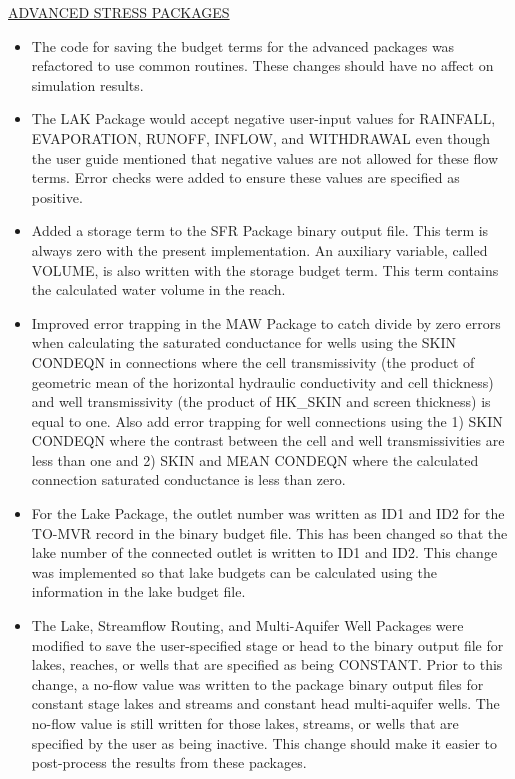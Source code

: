 \documentclass[11pt,twoside,twocolumn]{usgsreport}
\begin{document}
\begin{itemize}
	\underline{ADVANCED STRESS PACKAGES}
	\begin{itemize}
		\item The code for saving the budget terms for the advanced packages was refactored to use common routines.  These changes should have no affect on simulation results.
		\item The LAK Package would accept negative user-input values for  RAINFALL, EVAPORATION, RUNOFF, INFLOW, and WITHDRAWAL even though the user guide mentioned that negative values are not allowed for these flow terms.  Error checks were added to ensure these values are specified as positive.
		\item Added a storage term to the SFR Package binary output file.  This term is always zero with the present implementation.  An auxiliary variable, called VOLUME, is also written with the storage budget term.  This term contains the calculated water volume in the reach.
		\item  Improved error trapping in the MAW Package to catch divide by zero errors when calculating the saturated conductance for wells using the SKIN CONDEQN in connections where the cell  transmissivity (the product of geometric mean of the horizontal hydraulic conductivity and cell thickness) and well transmissivity (the product of HK\_SKIN and screen thickness) is equal to one. Also add error trapping for well connections using the 1) SKIN CONDEQN where the contrast between the cell and well transmissivities are less than one and 2) SKIN and MEAN CONDEQN where the calculated connection saturated conductance is less than zero.
		\item For the Lake Package, the outlet number was written as ID1 and ID2 for the TO-MVR record in the binary budget file.  This has been changed so that the lake number of the connected outlet is written to ID1 and ID2.  This change was implemented so that lake budgets can be calculated using the information in the lake budget file.
		\item The Lake, Streamflow Routing, and Multi-Aquifer Well Packages were modified to save the user-specified stage or head to the binary output file for lakes, reaches, or wells that are specified as being CONSTANT.  Prior to this change, a no-flow value was written to the package binary output files for constant stage lakes and streams and constant head multi-aquifer wells.  The no-flow value is still written for those lakes, streams, or wells that are specified by the user as being inactive.  This change should make it easier to post-process the results from these packages.
	\end{itemize}


\end{itemize}
\end{document}
